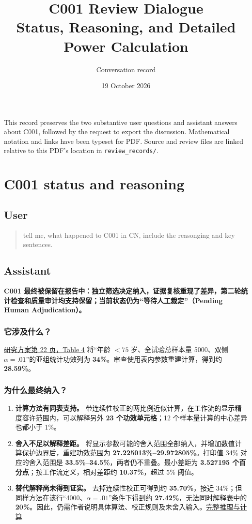 \documentclass[UTF8,fontset=none,11pt,a4paper]{ctexart}
\title{C001 Review Dialogue\\\large Status, Reasoning, and Detailed Power Calculation}
\author{Conversation record}
\date{19 October 2026}
\newcommand{\recordlink}[2]{\href{#1}{#2}}
\begin{document}
\maketitle
\noindent This record preserves the two substantive user questions and assistant answers about C001, followed by the request to export the discussion. Mathematical notation and links have been typeset for PDF. Source and review files are linked relative to this PDF's location in \texttt{review\_records/}.
\tableofcontents

\section{C001 status and reasoning}
\subsection*{User}
\begin{quote}
tell me, what happened to C001 in CN, include the reasonging and key sentences.
\end{quote}

\subsection*{Assistant}
\textbf{C001 最终被保留在报告中：独立筛选决定纳入，证据复核重现了差异，第二轮统计检查和质量审计均支持保留；当前状态仍为“等待人工裁定”（Pending Human Adjudication）。}

\subsubsection*{它涉及什么？}
\recordlink{../joi250068supp1_prod_1760999665.28862.pdf\#page=22}{研究方案第 22 页，Table 4} 将“年龄 $<75$ 岁、全试验总样本量 5000、双侧 $\alpha=.01$”的亚组统计功效列为 \textbf{34\%}。审查使用表内参数重建计算，得到约 \textbf{28.59\%}。

\subsubsection*{为什么最终纳入？}
\begin{enumerate}
\item \textbf{计算方法有同表支持。} 带连续性校正的两比例近似计算，在工作流的显示精度容许范围内，可以解释另外 \textbf{23 个功效单元格}；12 个样本量计算的中心差异也都小于 1\%。
\item \textbf{舍入不足以解释差距。} 将显示参数可能的舍入范围全部纳入，并增加数值计算保护边界后，重建功效范围为 \textbf{27.225013\%--29.972805\%}。打印值 34\% 对应的舍入范围是 \textbf{33.5\%--34.5\%}，两者仍不重叠。最小差距为 \textbf{3.527195 个百分点}；按工作流定义，相对差距约 \textbf{10.37\%}，超过 5\% 阈值。
\item \textbf{替代解释尚未得到证实。} 去掉连续性校正可得到约 \textbf{35.70\%}，接近 34\%；但同样方法在该行“4000、$\alpha=.01$”条件下得到约 \textbf{27.42\%}，无法同时解释表中的 \textbf{20\%}。因此，仍需作者说明具体算法、校正规则及未舍入输入。\recordlink{../.ai_paper_validation/final_report_1_6_2.md}{完整推理与计算}
\end{enumerate}
\end{document}
